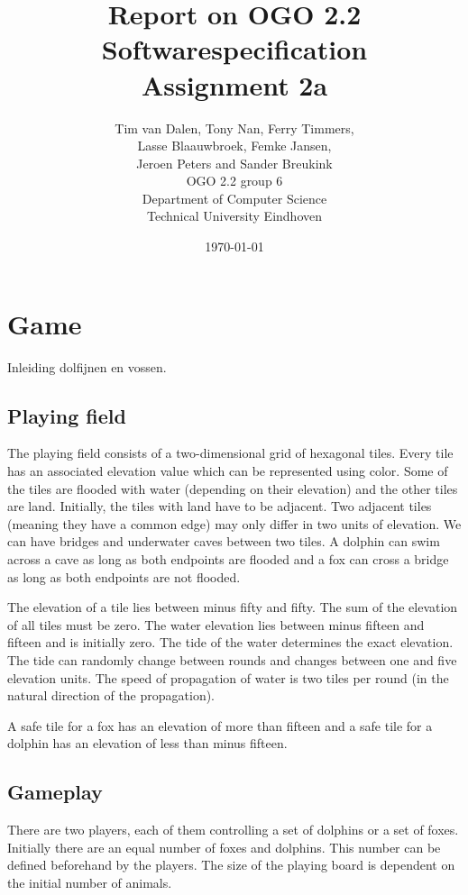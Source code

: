 \documentclass[12pt]{article}
\title{Report on OGO 2.2 Softwarespecification\\ Assignment 2a}
\author{
        Tim van Dalen, Tony Nan, Ferry Timmers, \\ Lasse Blaauwbroek, Femke Jansen, \\Jeroen Peters and Sander Breukink\\ OGO 2.2 group 6 \\
                Department of Computer Science\\
        Technical University Eindhoven\\
}
\date{\today}
\begin{document}
\maketitle

\begin{abstract}
\end{abstract}

\section{Game}

Inleiding dolfijnen en vossen.

\subsection{Playing field}

The playing field consists of a two-dimensional grid of hexagonal tiles. Every tile has an associated elevation value which can be represented using color. Some of the tiles are flooded with water (depending on their elevation) and the other tiles are land. Initially, the tiles with land have to be adjacent. Two adjacent tiles (meaning they have a common edge) may only differ in two units of elevation. We can have bridges and underwater caves between two tiles. A dolphin can swim across a cave as long as both endpoints are flooded and a fox can cross a bridge as long as both endpoints are not flooded.

The elevation of a tile lies between minus fifty and fifty. The sum of the elevation of all tiles must be zero. The water elevation lies between minus fifteen and fifteen and is initially zero. The tide of the water determines the exact elevation. The tide can randomly change between rounds and changes between one and five elevation units. The speed of propagation of water is two tiles per round (in the natural direction of the propagation).

A safe tile for a fox has an elevation of more than fifteen and a safe tile for a dolphin has an elevation of less than minus fifteen.

\subsection{Gameplay}
There are two players, each of them controlling a set of dolphins or a set of foxes. Initially there are an equal number of foxes and dolphins. This number can be defined beforehand by the players. The size of the playing board is dependent on the initial number of animals.
\end{document}
